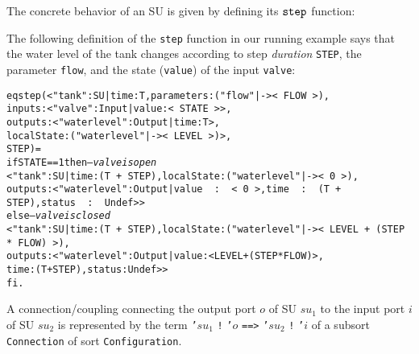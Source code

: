 

The concrete behavior of an SU is given by defining its $\mathtt{step}_{}$
function:

\begin{example}
The following definition of the \texttt{step} function in our running
example says that  the water level of the tank changes according to
step \emph{duration} \texttt{STEP}, the parameter \texttt{flow}, and the
state (\texttt{value}) of the input \texttt{valve}:

\scriptsize
\begin{alltt}
eq step(< "tank" : SU | time : T, parameters : ("flow" |-> <\,FLOW\,>), 
                        inputs : < "valve" : Input | value : <\,STATE\,> >, 
                        outputs : < "waterlevel" : Output | time : T >,
                        localState : ("waterlevel" |-> <\,LEVEL\,>) >,
        STEP) = 
  if STATE == 1 then    \emph{--- valve is open}
    < "tank" : SU | time : (T\,+\,STEP), localState : ("waterlevel" |-> <\,0\,>),
          outputs : < "waterlevel" : Output | value\,\,:\,\,<\,0\,>, time\,\,:\,\,(T\,+\,STEP), status\,\,:\,\,Undef > >
  else                  \emph{--- valve is closed}
    < "tank" : SU | time : (T\,+\,STEP),  localState : ("waterlevel" |-> <\,LEVEL\,+\,(STEP\,*\,FLOW)\,>), 
                    outputs : < "waterlevel" : Output | value : < LEVEL + (STEP * FLOW) >, 
                                                        time : (T + STEP), status : Undef > > 
  fi .
\end{alltt}
\normalsize
\end{example}

A connection/coupling connecting the output port $o$ of SU $\mathit{su}_1$ to
the input port $i$ of SU $\mathit{su}_2$ is represented by the term
\texttt{'}$\mathit{su}_1\,\,$\texttt{!} \texttt{'}$o$ \texttt{==>}
\texttt{'}$\mathit{su}_2\,\,$\texttt{!} \texttt{'}$i$ of a subsort
\texttt{Connection} of sort \texttt{Configuration}.  


